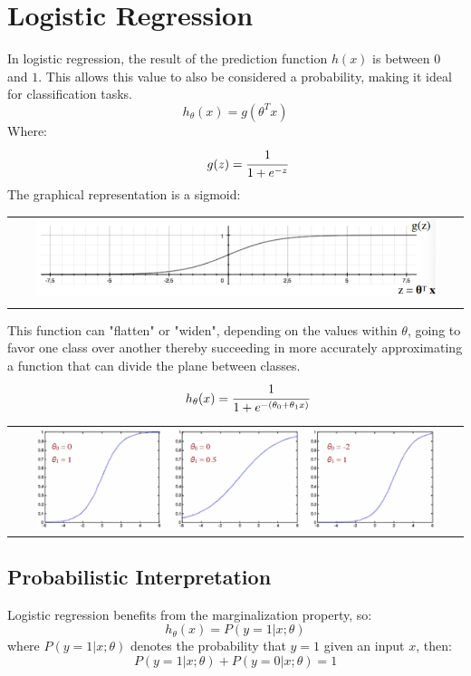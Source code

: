 \section{Logistic Regression}
In logistic regression, the result of the prediction function $h(x)$ is between $0$ and $1$. This allows this value to also be considered a probability, making it ideal for classification tasks.
\begin{equation} \tag{Prediction Function}
    h_\theta(x) = g(\theta^Tx)
\end{equation}
Where:
\begin{equation} \tag*{}
    g(z) = \cfrac{1}{1+e^{-z}}
\end{equation}
The graphical representation is a sigmoid:
\begin{center}
    \begin{tabular}{c}
        \\ \includegraphics[width=0.9\textwidth]{images/LogisticRegression1.png} \\ \\
    \end{tabular}
\end{center}
This function can "flatten" or "widen", depending on the values within $\theta$, going to favor one class over another thereby succeeding in more accurately approximating a function that can divide the plane between classes.
\begin{equation} \tag*{}
    h_\theta(x) = \cfrac{1}{1+e^{-(\theta_0+\theta_1x)}}
\end{equation}
\begin{center}
    \begin{tabular}{c}
        \\ \includegraphics[width=0.9\textwidth]{images/LogisticRegression2.png}
    \end{tabular}
\end{center}

\subsection{Probabilistic Interpretation}
Logistic regression benefits from the marginalization property, so:
\begin{equation} \tag*{}
    h_\theta(x) = P(y=1|x;\theta)
\end{equation}
where $P(y=1|x;\theta)$ denotes the probability that $y=1$ given an input $x$, then:
\begin{equation} \tag*{}
    P(y=1|x;\theta) + P(y=0|x;\theta) = 1
\end{equation}
\newpage
